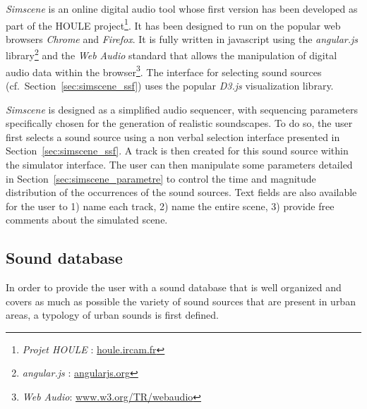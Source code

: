 \documentclass[12pt]{elsarticle}
\newcommand{\cf}{cf.}
\begin{document}
\emph{Simscene} is an online digital audio tool whose first version has been developed as part of the HOULE project\footnote{\emph{Projet HOULE} : \url{houle.ircam.fr}}. It has been designed to run on the popular web browsers \emph{Chrome} and \emph{Firefox}. It is fully written in javascript using the \emph{angular.js} library\footnote{\emph{angular.js} : \url{angularjs.org}} and the \emph{Web Audio} standard that allows the manipulation of digital audio data within the browser\footnote{\emph{Web Audio}: \url{www.w3.org/TR/webaudio}}. The interface for selecting sound sources (\cf~Section~\ref{sec:simscene_ssf}) uses the popular \emph{D3.js} \cite{d32011} visualization library.


\emph{Simscene} is designed as a simplified audio sequencer, with sequencing parameters specifically chosen for the generation of realistic soundscapes. To do so, the user first selects a sound source using a non verbal selection interface presented in Section~\ref{sec:simscene_ssf}. A track is then created for this sound source within the simulator interface. The user can then manipulate some parameters detailed in Section~\ref{sec:simscene_parametre} to control the time and magnitude distribution of the occurrences of the sound sources. Text fields are also available for the user to 1) name each track, 2) name the entire scene, 3) provide free comments about the simulated scene.

\subsection{Sound database}
\label{sec:simscene_sampleDataSet}


In order to provide the user with a sound database that is well organized and covers as much as possible the variety of sound sources that are present in urban areas, a typology of urban sounds is first defined.
\end{document}
